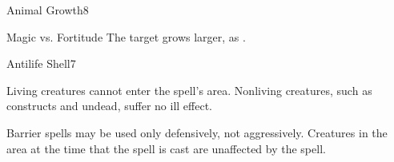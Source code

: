 \begin{spellsection}{Animal Growth}{8}
\begin{spellheader}
\end{spellheader}
\begin{spellcontent}
    \begin{spelltargetinginfo}
    \end{spelltargetinginfo}
    \begin{spelleffects}
        \begin{spellattack}{Magic vs. Fortitude}
            \spellsuccess The target grows larger, as .
        \end{spellattack}
    \end{spelleffects}
\end{spellcontent}
\begin{spellfooter}
    \spellnotes \sizingspellnotes
\end{spellfooter}
\end{spellsection}

\begin{spellsection}{Antilife Shell}{7}
\begin{spellheader}
\end{spellheader}
\begin{spellcontent}
    \begin{spelltargetinginfo}
    \end{spelltargetinginfo}
    \begin{spelleffects}
        \spelleffect Living creatures cannot enter the spell's area. Nonliving creatures, such as constructs and undead, suffer no ill effect.
        \spelldur \durlong \dismissable
    \end{spelleffects}
\end{spellcontent}
\begin{spellfooter}
    \spellnotes Barrier spells may be used only defensively, not aggressively. Creatures in the area at the time that the spell is cast are unaffected by the spell.
\end{spellfooter}
\end{spellsection}

